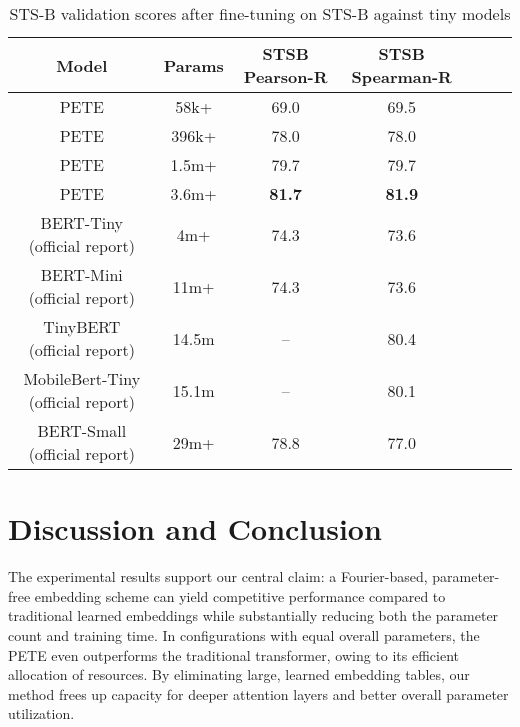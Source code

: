 \documentclass{article}
\begin{document}
\begin{table}[h!]
    \centering
    \begin{adjustbox}{max width=\textwidth}
    \begin{tabular}{|c|c|c|c|c|c|c|}
        \hline
        \textbf{Model} & \textbf{Params} & \textbf{STSB Pearson-R} & \textbf{STSB Spearman-R}\\
        \hline
        PETE & 58k+ & 69.0 & 69.5\\
        \hline
        PETE & 396k+ & 78.0 & 78.0\\
        \hline
        PETE & 1.5m+ & 79.7 & 79.7\\
        \hline
        PETE & 3.6m+ & \textbf{81.7} & \textbf{81.9}\\
        \hline
        BERT-Tiny (official report) & 4m+ & 74.3 & 73.6\\
        \hline
        BERT-Mini (official report) & 11m+ & 74.3 & 73.6\\
        \hline
        TinyBERT (official report) & 14.5m & -- & 80.4\\
        \hline 
        MobileBert-Tiny (official report) & 15.1m  &  -- & 80.1\\
        \hline
        BERT-Small (official report) & 29m+ & 78.8 & 77.0\\
        \hline
    \end{tabular}
    \end{adjustbox}
    \caption{STS-B validation scores after fine-tuning on STS-B against tiny models}
    \label{tab:model_comparisons}
\end{table}
\section{Discussion and Conclusion}
The experimental results support our central claim: a Fourier-based, parameter-free embedding scheme can yield competitive performance compared to traditional learned embeddings while substantially reducing both the parameter count and training time. In configurations with equal overall parameters, the PETE even outperforms the traditional transformer, owing to its efficient allocation of resources. By eliminating large, learned embedding tables, our method frees up capacity for deeper attention layers and better overall parameter utilization.
\end{document}
